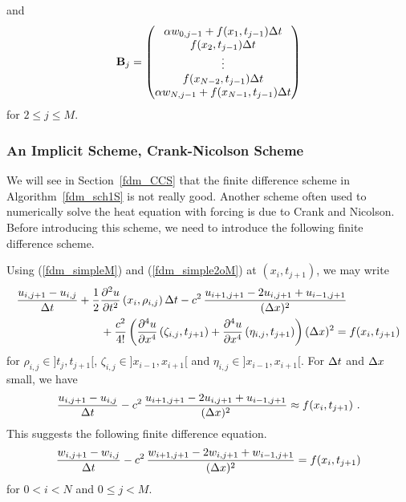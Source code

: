 and
\[
\mathbf{B}_j = \begin{pmatrix}
\alpha w_{0,j-1} + f(x_1,t_{j-1}) \Delta{t} \\
f(x_2,t_{j-1}) \Delta{t} \\
\vdots \\
f(x_{N-2},t_{j-1}) \Delta{t} \\
\alpha w_{N,j-1} + f(x_{N-1},t_{j-1}) \Delta{t}
\end{pmatrix}
\]
for $2\leq j \leq M$.

\subsubsection{An Implicit Scheme,  Crank-Nicolson Scheme}

We will see in Section~\ref{fdm_CCS} that the finite difference scheme
in Algorithm~\ref{fdm_sch1S} is not really good.  Another scheme often used
to numerically solve the heat equation with forcing is due to Crank
and Nicolson.  Before introducing this scheme, we need to introduce
the following finite difference scheme.

Using (\ref{fdm_simpleM}) and (\ref{fdm_simple2oM}) at
$(x_i,t_{j+1})$, we may write
\begin{align*}
\frac{u_{i,j+1}- u_{i,j}}{\Delta{t}} &+
\frac{1}{2} \frac{\partial^{2}{u}}{\partial{t}^{2}}\left(x_i,\rho_{i,j}\right) \Delta{t} - c^2 \,
\frac{u_{i+1,j+1} - 2u_{i,j+1} + u_{i-1,j+1}}{(\Delta{x})^2} \\
& \quad\quad + \frac{c^2}{4!}
\left( \frac{\partial^{4}{u}}{\partial{x}^{4}}\left(\zeta_{i,j},t_{j+1}\right)
+ \frac{\partial^{4}{u}}{\partial{x}^{4}}\left(\eta_{i,j},t_{j+1}\right) \right) (\Delta{x})^2
= f(x_i,t_{j+1})
\end{align*}
for $\rho_{i,j} \in ]t_j,t_{j+1}[$, $\zeta_{i,j} \in ]x_{i-1},x_{i+1}[$ and
$\eta_{i,j} \in ]x_{i-1},x_{i+1}[$.  For $\Delta{t}$ and $\Delta{x}$ small,
we have
\[
\frac{u_{i,j+1}- u_{i,j}}{\Delta{t}} - c^2 \,
\frac{u_{i+1,j+1} - 2u_{i,j+1} + u_{i-1,j+1}}{(\Delta{x})^2}
\approx f(x_i,t_{j+1}) \ .
\]
This suggests the following finite difference equation.
\begin{equation} \label{fdm_sch1M}
\frac{w_{i,j+1}- w_{i,j}}{\Delta{t}} - c^2 \,
\frac{w_{i+1,j+1} - 2w_{i,j+1} + w_{i-1,j+1}}{(\Delta{x})^2} = f(x_i,t_{j+1})
\end{equation}
for $0 < i <N$ and $0 \leq j < M$.

